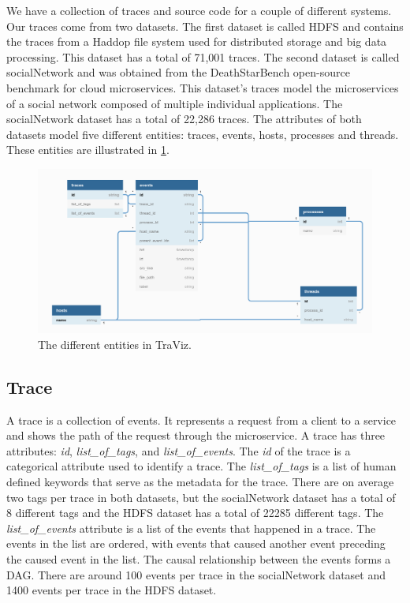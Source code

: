 \documentclass{article}
\begin{document}
We have a collection of traces and source code for a couple of different systems. Our traces come from two datasets.
The first dataset is called HDFS and contains the traces from a Haddop file system used for distributed storage 
and big data processing. This dataset has a total of 71,001 traces. The second dataset is called socialNetwork and
was obtained from the DeathStarBench open-source benchmark for cloud microservices. This dataset's traces model
the microservices of a social network composed of multiple individual applications. The socialNetwork dataset has
a total of 22,286 traces. The attributes of both datasets model five different entities: traces, events, hosts,
processes and threads. These entities are illustrated in \ref{fig:entities}.

\begin{figure}
    \includegraphics[width=\linewidth]{../data_abstractions.png}
    \caption{The different entities in TraViz.}
    \label{fig:entities}
  \end{figure}

\subsection{Trace}

A trace is a collection of events. It represents a request from a client to a service and shows the path of the
request through the microservice. A trace has three attributes: \textit{id}, \textit{list\_of\_tags}, and \textit{list\_of\_events}.
The \textit{id} of the trace is a categorical attribute used to identify a trace. The \textit{list\_of\_tags} is a list of human defined keywords that serve as
the metadata for the trace. There are on average two tags per trace in both datasets, but the socialNetwork
dataset has a total of 8 different tags and the HDFS dataset has a total of 22285 different tags. The
\textit{list\_of\_events} attribute is a list of the events that happened in a trace. The events in the list
are ordered, with events that caused another event preceding the caused event in the list. The causal relationship
between the events forms a DAG. There are around 100 events per trace in the socialNetwork dataset and 1400 events per trace
in the HDFS dataset.
\end{document}
